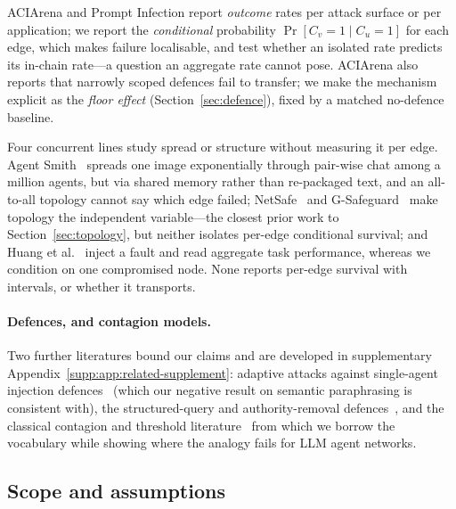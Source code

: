 \documentclass[sigconf,anonymous]{aamas}
\newcommand{\suppref}[1]{supplementary Appendix~\ref{supp:#1}}
\begin{document}
ACIArena and Prompt Infection report \emph{outcome} rates per attack
surface or per application; we report the \emph{conditional} probability
$\Pr[C_v{=}1 \mid C_u{=}1]$ for each edge, which makes failure localisable, and
test whether an isolated rate predicts its in-chain rate---a question an aggregate
rate cannot pose. ACIArena also reports that narrowly scoped defences fail to
transfer; we make the mechanism explicit as the \emph{floor effect}
(Section~\ref{sec:defence}), fixed by a matched no-defence baseline.

Four concurrent lines study spread or structure without measuring it per edge. Agent
Smith~\cite{Gu2024AgentSmith} spreads one image exponentially through pair-wise chat
among a million agents, but via shared memory rather than re-packaged text, and an
all-to-all topology cannot say which edge failed; NetSafe~\cite{Yu2025NetSafe} and
G-Safeguard~\cite{Wang2025GSafeguard} make topology the independent variable---the
closest prior work to Section~\ref{sec:topology}, but neither isolates per-edge
conditional survival; and Huang et al.~\cite{Huang2025Resilience} inject a fault and
read aggregate task performance, whereas we condition on one compromised node. None
reports per-edge survival with intervals, or whether it transports.

\paragraph{Defences, and contagion models.} Two further literatures bound our claims and
are developed in \suppref{app:related-supplement}: adaptive attacks against
single-agent injection defences~\cite{Zhan2025Adaptive} (which our negative result on
semantic paraphrasing is consistent with), the structured-query and
authority-removal defences~\cite{StrUQ2025,Hines2024CAMLIS,Debenedetti2026CaMeL}, and
the classical contagion and threshold literature~\cite{KermackMcKendrick1927,
Granovetter1978,Watts2002,PastorSatorras2001,Newman2002,KeelingEames2005,
WattsStrogatz1998,Albert2000ErrorTolerance,Centola2010,Kempe2003,SwarmMarkov2026} from
which we borrow the vocabulary while showing where the analogy fails for LLM agent
networks.



\subsection{Scope and assumptions}
\label{sec:theory}
\end{document}
